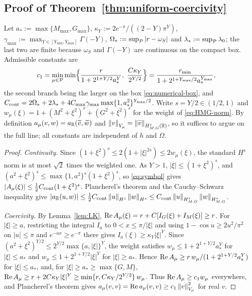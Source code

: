 \subsection{Proof of Theorem~\ref{thm:uniform-coercivity}}
\label{app:proof-uniform}\label{ssec:lk-coercivity}
Let $a_\ast:=\max\{M_{\max},G_{\max}\}$, $\kappa_Y:=2e^{-\pi}/((2-Y)\pi^{Y})$,
$\gamma_{\max}:=\max_{Y\in[Y_{\min},Y_{\max}]}\Gamma(-Y)$, $\Omega_\ast:=\sup_{\mathcal{P}}|r-\omega_S|$ and
$\lambda_\ast:=\sup_{\mathcal{P}}\lambda_0$; the last two are finite because $\omega_S$ and $\Gamma(-Y)$ are
continuous on the compact box.  Admissible constants are
\begin{equation}
  c_1=\min_{\mu\in\Pset}\min\Bigl\{\frac{\rf}{1+2^{1+Y/2}a_\ast^{Y}},\ \frac{C\kappa_Y}{2^{Y/2}}\Bigr\}
  =\frac{r_{\min}}{1+2^{1+Y_{\max}/2}a_\ast^{Y_{\max}}},
  \label{eq:c1-explicit}
\end{equation}
the second branch being the larger on the box \eqref{eq:numerical-box}, and
$C_{\rm cont}=2\Omega_\ast+2\lambda_\ast+4C_{\max}\gamma_{\max}\max\{1,a_\ast^2\}^{Y_{\max}/2}$.
Write $s=Y/2\in(1/2,1)$ and $w_\mu(\xi)=1+(M^2+\xi^2)^{s}+(G^2+\xi^2)^{s}$ for the weight of
\eqref{eq:HMG-norm}.  By definition $a_\mu(v,w)=a_{\mathbb{R}}(\widetilde v,\widetilde w)$ and
$\left\lVert v\right\rVert_{V_\mu}=\left\lVert \widetilde v\right\rVert_{H^{s}_{M,G}(\mathbb{R})}$, so it suffices to argue on the full line;
all constants are independent of $h$ and $\Omega$.

\begin{proof}
\emph{Continuity.}  Since $(1+\xi^2)^{s}\le2(1+|\xi|^{2s})\le2w_\mu(\xi)$, the standard $H^{s}$ norm is
at most $\sqrt2$ times the weighted one.  As $Y>1$, $|\xi|\le(1+\xi^2)^{s}$, and
$(a^2+\xi^2)^{s}\le\max\{1,a^2\}^{s}(1+\xi^2)^{s}$, so \eqref{eq:symbol} gives
$|A_\mu(\xi)|\le\tfrac12C_{\rm cont}(1+\xi^2)^{s}$.  Plancherel's theorem and the Cauchy--Schwarz
inequality give $|a_{\mathbb{R}}(u,w)|\le\tfrac12C_{\rm cont}\left\lVert u\right\rVert_{H^s}\left\lVert w\right\rVert_{H^s}\le
C_{\rm cont}\left\lVert u\right\rVert_{H^s_{M,G}}\left\lVert w\right\rVert_{H^s_{M,G}}$.

\emph{Coercivity.}  By Lemma~\ref{lem:LK}, $\operatorname{Re} A_\mu(\xi)=r+C[I_G(\xi)+I_M(\xi)]\ge r$.  For
$|\xi|\ge a$, restricting the integral $I_a$ to $0<x\le\pi/|\xi|$ and using $1-\cos u\ge2u^2/\pi^2$
on $|u|\le\pi$ and $e^{-ax}\ge e^{-\pi}$ there gives $I_a(\xi)\ge\kappa_Y|\xi|^{Y}$.  Since
$(a^2+\xi^2)^{Y/2}\le2^{Y/2}\max\{a,|\xi|\}^{Y}$, the weight satisfies
$w_\mu\le1+2^{1+Y/2}a_\ast^{Y}$ for $|\xi|\le a_\ast$ and $w_\mu\le1+2^{1+Y/2}|\xi|^{Y}$ for
$|\xi|\ge a_\ast$.  Hence $\operatorname{Re} A_\mu\ge r\,w_\mu/(1+2^{1+Y/2}a_\ast^{Y})$ for $|\xi|\le a_\ast$, and,
for $|\xi|\ge a_\ast\ge\max\{G,M\}$, $\operatorname{Re} A_\mu\ge r+2C\kappa_Y|\xi|^{Y}\ge
\min\{r,C\kappa_Y/2^{Y/2}\}\,w_\mu$.  Thus $\operatorname{Re} A_\mu\ge c_1w_\mu$ everywhere, and Plancherel's
theorem gives $a_\mu(v,v)=\operatorname{Re} a_\mu(v,v)\ge c_1\left\lVert v\right\rVert_{V_\mu}^2$ for real $v$.
\end{proof}

